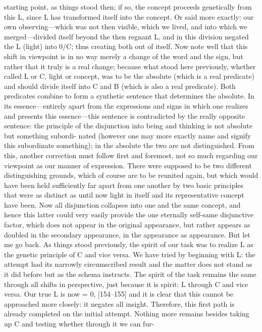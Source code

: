 starting point, as things stood then; if so, the concept proceeds
genetically from this L, since L has transformed itself into the concept.
 Or
said more exactly: our own observing—which was not then visible, which we
lived, and into which we merged—divided itself beyond the then regnant L,
and in this division negated the L (light) into 0/C; thus creating both out of
itself.
 Now note well that this shift in viewpoint is in no way merely a change
of the word and the sign, but rather that it truly is a real change; because what
stood here previously, whether called L or C, light or concept, was to be the
absolute (which is a real predicate) and should divide itself into C and B
(which is also a real predicate).
 Both predicates combine to form a synthetic
sentence that determines the absolute.
 In its essence—entirely apart from the
expressions and signs in which one realizes and presents this essence—this
sentence is contradicted by the really opposite sentence: the principle of the
disjunction into being and thinking is not absolute but something subordi-
nated (however one may more exactly name and signify this subordinate
something); in the absolute the two are not distinguished.
 From this,
another correction must follow first and foremost, not so much regarding
our viewpoint as our manner of expression.
 There were supposed to be two
different distinguishing grounds, which of course are to be reunited again,
but which would have been held sufficiently far apart from one another by
two basic principles that were as distinct as until now light in itself and its
representative concept have been.
 Now all disjunction collapses into one and
the same concept, and hence this latter could very easily provide the one
eternally self-same disjunctive factor, which does not appear in the original
appearance, but rather appears as doubled in the secondary appearance, in
the appearance as appearance.
But let me go back.
 As things stood previously, the spirit of our task was
to realize L as the genetic principle of C and vice versa.
 We have tried by
beginning with L: the attempt had its narrowly circumscribed result and the
matter does not stand as it did before but as the schema instructs.
 The spirit
of the task remains the same through all shifts in perspective, just because it
is spirit: L through C and vice versa.
 Our true L is now = 0, [154–155] and it is
clear that this cannot be approached more closely: it negates all insight.
Therefore, this first path is already completed on the initial attempt.
 Nothing
more remains besides taking up C and testing whether through it we can fur-
